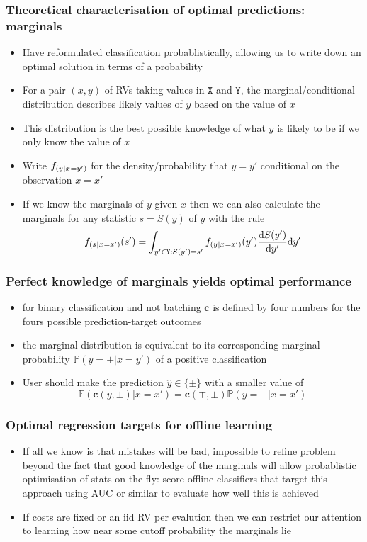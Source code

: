 \documentclass{beamer}
\newcommand{\TYPE}[1][X]{{\texttt{#1}}}
\newcommand{\TYPEY}{{\TYPE[Y]}}
\newcommand{\IN}{\TYPE}
\newcommand{\OUT}{\TYPEY}
\newcommand{\TWO}{\{\pm\}}
\newcommand{\dee}{\textrm{d}}
\newcommand{\Feature}{{x}}
\newcommand{\Target}{{y}}
\newcommand{\FeatureD}{{x'}}
\newcommand{\TargetD}{{y'}}
\newcommand{\STAT}{{S}}
\newcommand{\Stat}{{s}}
\newcommand{\StatD}{{\Stat'}}
\newcommand{\ScoreFun}{{\textbf{c}}}
\newcommand{\Pred}[1][y]{{\hat{#1}}}
\begin{document}
\begin{frame}
\frametitle{Theoretical characterisation of optimal predictions: marginals}
  \begin{itemize}
  \item
    Have reformulated classification probablistically, allowing us to write down an optimal solution in terms of a probability
    \item
      For a pair $(\Feature,\Target)$ of RVs taking values in $\IN$ and $\OUT$, the marginal/conditional distribution describes likely values of $\Target$ based on the value of $\Feature$
    \item
      This distribution is the best possible knowledge of what $\Target$ is likely to be if we only know the value of $\Feature$
    \item
        Write $\Marginal$ for the density/probability that $\Target=\TargetD$ conditional on the observation $\Feature=\FeatureD$
  \item
    If we know the marginals of $\Target$ given $\Feature$ then we can also calculate the marginals for any statistic $\Stat=\STAT(\Target)$ of $\Target$ with the rule
      $$
      \Marginal[][\Stat][\Feature][\FeatureD](\StatD)=\int_{\TargetD\in\OUT:\STAT(\TargetD)=\StatD}\Marginal[][\Target][\Feature][\FeatureD](\TargetD)\frac{\dee\STAT(\TargetD)}{\dee\TargetD}\dee\TargetD
      $$
  \end{itemize}
\end{frame}
\begin{frame}
\frametitle{Perfect knowledge of marginals yields optimal performance}
  \begin{itemize}
        \item
      for binary classification and not batching $\ScoreFun$ is defined by four numbers for the fours possible prediction-target outcomes
        \item
          the marginal distribution is equivalent to its corresponding marginal probability $\mathbb P(\Target=+|\Feature=\TargetD)$ of a positive classification
    \item
      User should make the prediction $\Pred\in\TWO$ with a smaller value of
          $$
          \mathbb E(\ScoreFun(\Target,\pm)|\Feature=\FeatureD)=\ScoreFun(\mp,\pm)\mathbb P(\Target=+|\Feature=\FeatureD)
          $$
      \end{itemize}
\end{frame}
\begin{frame}
\frametitle{Optimal regression targets for offline learning}
  \begin{itemize}
  \item
    If all we know is that mistakes will be bad, impossible to refine problem beyond the fact that good knowledge of the marginals will allow probablistic optimisation of stats on the fly: score offline classifiers that target this approach using AUC or similar to evaluate how well this is achieved
  \item
    If costs are fixed or an iid RV per evalution then we can restrict our attention to learning how near some cutoff probability the marginals lie
  \end{itemize}
  \end{frame}
\end{document}
